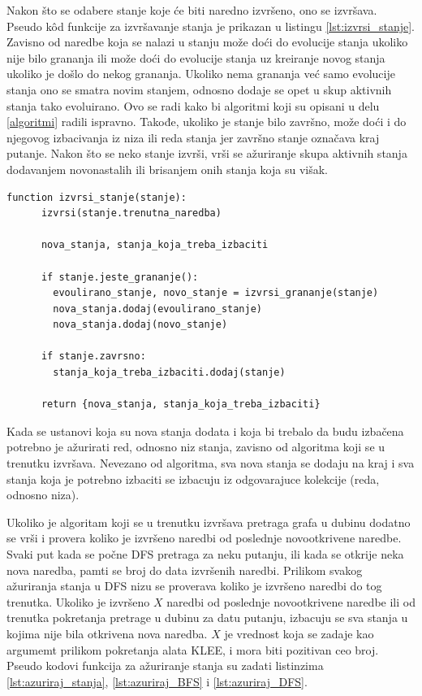 \documentclass[12pt,oneside]{memoir}
\begin{document}
Nakon što se odabere stanje koje će biti naredno izvršeno, ono se izvršava. Pseudo k\^od funkcije za izvršavanje stanja je prikazan u listingu \ref{lst:izvrsi_stanje}. Zavisno od naredbe koja se nalazi u stanju može doći do evolucije stanja ukoliko nije bilo grananja ili može doći do evolucije stanja uz kreiranje novog stanja ukoliko je došlo do nekog grananja. Ukoliko nema grananja već samo evolucije stanja ono se smatra novim stanjem, odnosno dodaje se opet u skup aktivnih stanja tako evoluirano. Ovo se radi kako bi algoritmi koji su opisani u delu \ref{algoritmi} radili ispravno. Takođe, ukoliko je stanje bilo završno, može doći i do njegovog izbacivanja iz niza ili reda stanja jer završno stanje označava kraj putanje. Nakon što se neko stanje izvrši, vrši se ažuriranje skupa aktivnih stanja dodavanjem novonastalih ili brisanjem onih stanja koja su višak.

    \begin{lstlisting}[caption={Pseudo k\^od funkcije koja izvrsava stanje},captionpos=b,label={lst:izvrsi_stanje}]
    function izvrsi_stanje(stanje):
      izvrsi(stanje.trenutna_naredba)
      
      nova_stanja, stanja_koja_treba_izbaciti
      
      if stanje.jeste_grananje():
        evoulirano_stanje, novo_stanje = izvrsi_grananje(stanje)
        nova_stanja.dodaj(evoulirano_stanje)
        nova_stanja.dodaj(novo_stanje)
      
      if stanje.zavrsno:
        stanja_koja_treba_izbaciti.dodaj(stanje)
        
      return {nova_stanja, stanja_koja_treba_izbaciti}
    \end{lstlisting}
    
Kada se ustanovi koja su nova stanja dodata i koja bi trebalo da budu izbačena potrebno je ažurirati red, odnosno niz stanja, zavisno od algoritma koji se u trenutku izvršava. Nevezano od algoritma, sva nova stanja se dodaju na kraj i sva stanja koja je potrebno izbaciti se izbacuju iz odgovarajuce kolekcije (reda, odnosno niza). 

Ukoliko je algoritam koji se u trenutku izvršava pretraga grafa u dubinu dodatno se vrši i provera koliko je izvršeno naredbi od poslednje novootkrivene naredbe. Svaki put kada se počne DFS pretraga za neku putanju, ili kada se otkrije neka nova naredba, pamti se broj do data izvršenih naredbi. Prilikom svakog ažuriranja stanja u DFS nizu se proverava koliko je izvršeno naredbi do tog trenutka. Ukoliko je izvršeno $X$ naredbi od poslednje novootkrivene naredbe ili od trenutka pokretanja pretrage u dubinu za datu putanju, izbacuju se sva stanja u kojima nije bila otkrivena nova naredba. $X$ je vrednost koja se zadaje kao argumemt prilikom pokretanja alata KLEE, i mora biti pozitivan ceo broj. Pseudo kodovi funkcija za ažuriranje stanja su zadati listinzima \ref{lst:azuriraj_stanja}, \ref{lst:azuriraj_BFS} i \ref{lst:azuriraj_DFS}.
\end{document}
